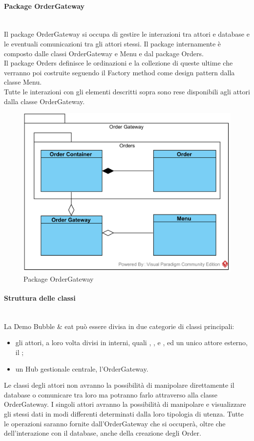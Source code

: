 \paragraph{Package Order\-Gateway}\mbox{}\\
Il package Order\-Gateway si occupa di gestire le interazioni tra attori e database e le eventuali comunicazioni tra gli attori stessi. Il package internamente è composto dalle classi Order\-Gateway e Menu e dal package Orders.\\
Il package Orders definisce le ordinazioni e la collezione di queste ultime che verranno poi costruite seguendo il Factory method come design pattern dalla classe Menu.\\
Tutte le interazioni con gli elementi descritti sopra sono rese disponibili agli attori dalla classe Order\-Gateway.
\begin{figure}[H]
	\centering
	\includegraphics[width=14cm]{diagrammi_img/classi_e_package/ordergate.png}
	\caption{Package Order\-Gateway}
\end{figure}

\paragraph{Struttura delle classi}\mbox{}\\
La Demo Bubble \& eat può essere divisa in due categorie di classi principali:
\begin{itemize}
	\item gli attori, a loro volta divisi in interni, quali \Manager{}, \Chef{}, \Deliveryman{} e \Purchasingmanager{}, ed un unico attore esterno, il \Customer{};
	\item un Hub gestionale centrale, l’Order\-Gateway.
\end{itemize}
Le classi degli attori non avranno la possibilità di manipolare direttamente il database o comunicare tra loro ma potranno farlo attraverso alla classe Order\-Gateway.
I singoli attori avranno la possibilità di manipolare e visualizzare gli stessi dati in modi differenti determinati dalla loro tipologia di utenza.
Tutte le operazioni saranno fornite dall'Order\-Gateway che si occuperà, oltre che dell'interazione con il database, anche della creazione degli Order.

